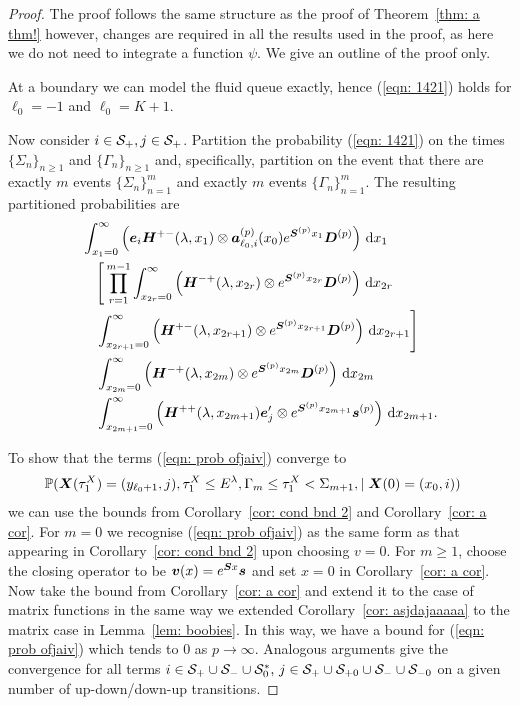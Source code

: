 \begin{proof}
	The proof follows the same structure as the proof of Theorem~\ref{thm: a thm!} however, changes are required in all the results used in the proof, as here we do not need to integrate a function \(\psi\). We give an outline of the proof only. 

	At a boundary we can model the fluid queue exactly, hence (\ref{eqn: 1421}) holds for \(\ell_0=-1\) and \(\ell_0=K+1\).

	Now consider \(i\in \mathcal{S}_+,j\in\mathcal{S}_+\). Partition the probability (\ref{eqn: 1421}) on the times \(\{\Sigma_n\}_{n\geq 1}\) and \(\{\Gamma_n\}_{n\geq 1}\) and, specifically, partition on the event that there are exactly \(m\) events \(\{\Sigma_n\}_{n=1}^m\) and exactly \(m\) events \(\{\Gamma_n\}_{n=1}^m\). 
	The resulting partitioned probabilities are
	\begin{align}
                 &\int_{x_1=0}^\infty \left(\boldsymbol e_i\boldsymbol H^{+-}(\lambda,x_1)\otimes \boldsymbol a_{\ell_0,i}^{(p)}(x_0)e^{\boldsymbol{S}^{(p)}x_1}\boldsymbol{D}^{(p)}\right)\, \mathrm{d} x_1 \nonumber
            	\\&\nonumber \quad \Bigg[\prod_{r=1}^{m-1} \int_{x_{2r}=0}^\infty \left(\boldsymbol H^{-+}(\lambda,x_{2r}) \otimes e^{\boldsymbol{S}^{(p)}x_{2r}}\boldsymbol D^{(p)}\right)\, \mathrm{d} x_{2r} \\&\quad \int_{x_{2r+1}=0}^\infty \left(\boldsymbol H^{+-}(\lambda,x_{2r+1}) \otimes e^{\boldsymbol{S}^{(p)}x_{2r+1}}\boldsymbol D^{(p)}\right) \, \mathrm{d} x_{2r+1}\Bigg] \nonumber
            	\\&
            	\quad \int_{x_{2m}=0}^\infty \left(\boldsymbol H^{-+}(\lambda, x_{2m}) \otimes e^{\boldsymbol{S}^{(p)}x_{2m}}\boldsymbol{D}^{(p)}\right) \, \mathrm{d} x_{2m} \nonumber
				\\&\quad \int_{x_{2m+1}=0}^\infty \left( \boldsymbol H^{++}(\lambda,x_{2m+1})\boldsymbol e_j'{} \otimes  e^{\boldsymbol{S}^{(p)}x_{2m+1}}\boldsymbol s^{(p)} \right) \, \mathrm{d} x_{2m+1}.  \label{eqn: prob ofjaiv}
	\end{align}

	To show that the terms (\ref{eqn: prob ofjaiv}) converge to 
	\begin{align}
		&\mathbb P(\boldsymbol X(\tau_1^X)=(y_{\ell_0+1},j),\tau_1^X\leq E^\lambda, \Gamma_{m}\leq \tau_1^X<\Sigma_{m+1}, \mid \boldsymbol X(0)=(x_0, i))
	\end{align}
	we can use the bounds from Corollary~\ref{cor: cond bnd 2} and Corollary~\ref{cor: a cor}. For \(m=0\) we recognise (\ref{eqn: prob ofjaiv}) as the same form as that appearing in Corollary~\ref{cor: cond bnd 2} upon choosing \(v=0\). For \(m\geq 1\), choose the closing operator to be \(\boldsymbol v(x)=e^{\boldsymbol S x}\boldsymbol s\) and set \(x=0\) in Corollary~\ref{cor: a cor}. Now take the bound from Corollary~\ref{cor: a cor} and extend it to the case of matrix functions in the same way we extended Corollary~\ref{cor: asjdajaaaaa} to the matrix case in Lemma~\ref{lem: boobies}. In this way, we have a bound for (\ref{eqn: prob ofjaiv}) which tends to \(0\) as \(p\to\infty\). Analogous arguments give the convergence for all terms \(i\in\mathcal{S}_+\cup\mathcal{S}_-\cup\mathcal{S}_0^*,\,j\in\mathcal{S}_+\cup\mathcal{S}_{+0}\cup\mathcal{S}_-\cup\mathcal{S}_{-0}\) on a given number of up-down/down-up transitions. 


\end{proof}
